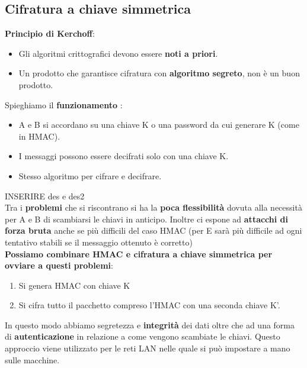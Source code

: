 \documentclass[12pt]{article}
\begin{document}
		\subsection{Cifratura a chiave simmetrica}
			\textbf{Principio di Kerchoff}:
			\begin{itemize}
				\item Gli algoritmi crittografici devono essere \textbf{noti a priori}.
				\item Un prodotto che garantisce cifratura con \textbf{algoritmo segreto}, non è un buon prodotto.
			\end{itemize}
			Spieghiamo il \textbf{funzionamento	}:
			\begin{itemize}
				\item A e B si accordano su una chiave K o una password da cui generare K (come in HMAC).
				\item I messaggi possono essere decifrati solo con una chiave K.
				\item Stesso algoritmo per cifrare e decifrare.					
			\end{itemize}
				
			INSERIRE des e des2\\
				
			Tra i \textbf{problemi} che si riscontrano si ha la \textbf{poca flessibilità} dovuta alla necessità per A e B di scambiarsi le chiavi in anticipo. Inoltre ci espone ad \textbf{attacchi di forza bruta} anche se più difficili del caso HMAC (per E sarà più difficile ad ogni tentativo stabili se il messaggio ottenuto è corretto)\\
			\textbf{Possiamo combinare HMAC e cifratura a chiave simmetrica per ovviare a questi problemi}:
			\begin{enumerate}
				\item Si genera HMAC con chiave K
				\item Si cifra tutto il pacchetto compreso l'HMAC con una seconda chiave K'.
			\end{enumerate}
			In questo modo abbiamo segretezza e \textbf{integrità} dei dati oltre che ad una forma di \textbf{autenticazione} in relazione a come vengono scambiate le chiavi. Questo approccio viene utilizzato per le reti LAN nelle quale si può impostare a mano sulle macchine.
			
\end{document}
